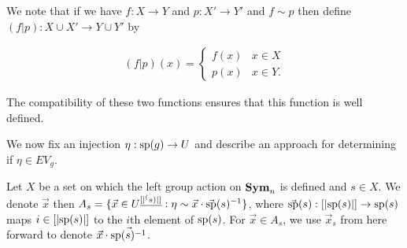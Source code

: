 \documentclass[../paper.tex]{subfiles}
\begin{document}
We note that if we have $f : X \rightarrow Y$ and $p: X' \rightarrow Y'$ and $f
\sim p$ then define $(f \vert p): X \cup X' \rightarrow Y \cup Y'$ by

\begin{align*}
  (f \vert p) (x) =
  \begin{cases}
    f (x) & x \in X \\
    p (x) & x \in Y.
  \end{cases}
\end{align*}

The compatibility of these two functions ensures that this function is well
defined.




We now fix an injection $\eta : \text{sp}(g) \rightarrow U$ and describe an
approach for determining if $\eta \in EV_g$.

Let $X$ be a set on which the left group action on $\text{\textbf{Sym}}_n$ is defined and $s
\in X$. We denote $\vec{x}$ then $A_s = \{\vec{x} \in U^{\underline{[\vert
    \sp(s) \vert ]}} : \eta \sim \vec{x} \cdot \vec{\text{sp}}(s)^{-1} \}$, where
$\vec{\text{sp}}(s): [\vert \text{sp}(s) \vert] \rightarrow \text{sp}(s)$ maps $i \in
[\vert \text{sp}(s) \vert]$ to the $i$th element of $\text{sp}(s)$. For $\vec{x} \in
A_s$, we use $\vec{x}_s$ from here forward to denote $\vec{x} \cdot
\vec{\text{sp}(s)^{-1}}$.

\end{document}
